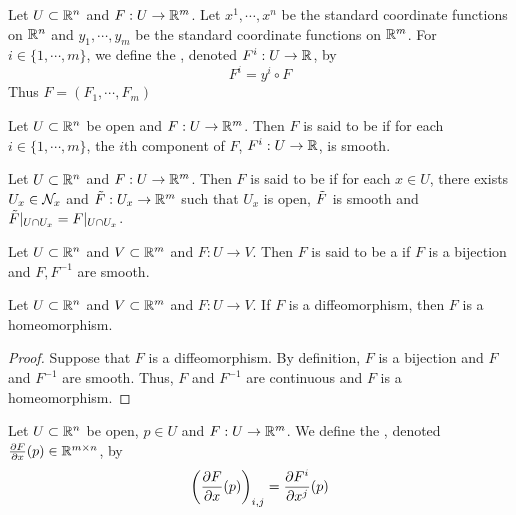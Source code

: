 \documentclass{book}
\begin{document}
	\begin{defn} 
	Let $U \subset \mathbb{R}^n$ and $F: U \rightarrow \mathbb{R}^m$. Let $x^1, \cdots, x^n$ be the standard coordinate functions on $\mathbb{R}^n$ and $y_1, \cdots, y_m$ be the standard coordinate functions on $\mathbb{R}^m$. For $i \in \{1, \cdots, m\}$, we define the , denoted $F^i: U \rightarrow \mathbb{R}$, by $$F^i = y^i \circ F$$ 
	Thus $F = (F_1, \cdots, F_m)$
	\end{defn}
	
	\begin{defn} 
	Let $U \subset \mathbb{R}^n$ be open and $F: U \rightarrow \mathbb{R}^m$. Then $F$ is said to be  if for each $i \in \{1, \cdots, m\}$, the $i$th component of $F$, $F^i: U \rightarrow \mathbb{R}$, is smooth.
	\end{defn}

	\begin{defn} 
		Let $U \subset \mathbb{R}^n$ and $F: U \rightarrow \mathbb{R}^m$. Then $F$ is said to be  if for each $x \in U$, there exists $U_x \in \mathcal{N}_x$ and $\tilde{F} : U_x \rightarrow \mathbb{R}^m$ such that $U_x$ is open, $\tilde{F}$ is smooth and $\tilde{F}|_{U \cap U_x} = F|_{U \cap U_x}$.
	\end{defn}

	\begin{defn} 
		Let $U \subset \mathbb{R}^n$ and $V \subset \mathbb{R}^m$ and $F: U \rightarrow V$. Then $F$ is said to be a   if $F$ is a bijection and $F, F^{-1}$ are smooth. 
	\end{defn}
	
	\begin{ex} 
	Let $U \subset \mathbb{R}^n$ and $V \subset \mathbb{R}^m$ and $F: U \rightarrow V$. If $F$ is a diffeomorphism, then $F$ is a homeomorphism.
	\end{ex}
	
	\begin{proof}
	Suppose that $F$ is a diffeomorphism. By definition, $F$ is a bijection and $F$ and $F^{-1}$ are smooth. Thus, $F$ and $F^{-1}$ are continuous and $F$ is a homeomorphism.
	\end{proof}
	
	\begin{defn} 
	Let $U \subset \mathbb{R}^n$ be open, $p \in U$ and $F: U \rightarrow \mathbb{R}^m$. We define the , denoted $\frac{\partial F}{\partial x}(p) \in \mathbb{R}^{m \times n}$, by $$\bigg (\frac{\partial F}{\partial x}(p) \bigg )_{i,j} = \frac{\partial F^i}{\partial x^j}(p)$$
	\end{defn}
	
\end{document}

